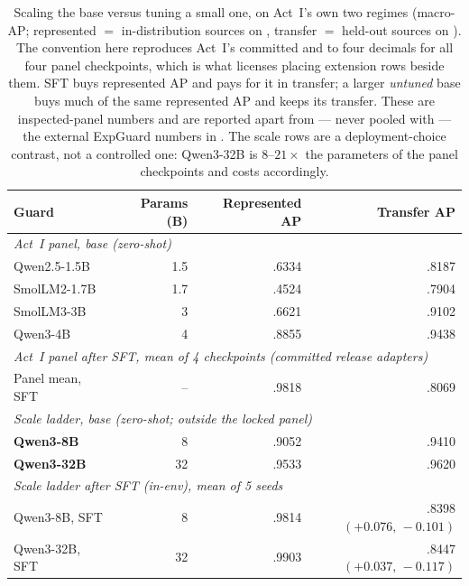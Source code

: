 \begin{table}[H]\centering\small
\caption{Scaling the base versus tuning a small one, on Act~I's own two regimes (macro-AP; represented $=$ in-distribution sources on , transfer $=$ held-out sources on ). The convention here reproduces Act~I's committed  and  to four decimals for all four panel checkpoints, which is what licenses placing extension rows beside them. SFT buys represented AP and pays for it in transfer; a larger \emph{untuned} base buys much of the same represented AP and keeps its transfer. These are inspected-panel numbers and are reported apart from --- never pooled with --- the external ExpGuard numbers in . The scale rows are a deployment-choice contrast, not a controlled one: Qwen3-32B is $8$--$21\times$ the parameters of the panel checkpoints and costs accordingly.}
\label{tab:frontier-scale}
\begin{tabular}{lrrr}\toprule
Guard & Params (B) & Represented AP & Transfer AP \\
\midrule
\multicolumn{4}{l}{\emph{Act~I panel, base (zero-shot)}} \\
Qwen2.5-1.5B & 1.5 & .6334 & .8187 \\
SmolLM2-1.7B & 1.7 & .4524 & .7904 \\
SmolLM3-3B & 3 & .6621 & .9102 \\
Qwen3-4B & 4 & .8855 & .9438 \\
\midrule
\multicolumn{4}{l}{\emph{Act~I panel after SFT, mean of 4 checkpoints (committed release adapters)}} \\
Panel mean, SFT & -- & .9818 & .8069 \\
\midrule
\multicolumn{4}{l}{\emph{Scale ladder, base (zero-shot; outside the locked panel)}} \\
\textbf{Qwen3-8B} & 8 & .9052 & .9410 \\
\textbf{Qwen3-32B} & 32 & .9533 & .9620 \\
\midrule
\multicolumn{4}{l}{\emph{Scale ladder after SFT (in-env), mean of 5 seeds}} \\
Qwen3-8B, SFT & 8 & .9814 & .8398 \;\footnotesize$(+0.076,\,-0.101)$ \\
Qwen3-32B, SFT & 32 & .9903 & .8447 \;\footnotesize$(+0.037,\,-0.117)$ \\
\bottomrule
\end{tabular}
\end{table}
